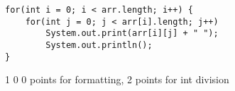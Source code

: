 \documentclass[12pt]{article}
\begin{document}
\begin{enumerate}
\begin{lstlisting}
for(int i = 0; i < arr.length; i++) {
	for(int j = 0; j < arr[i].length; j++)
		System.out.print(arr[i][j] + " ");
    	System.out.println();
}
\end{lstlisting}

\Ans {} 1 0  0   points for formatting, 2 points for int division
\clearpage
\ifdraft \clearpage \fi

\end{enumerate}   
\end{document}
